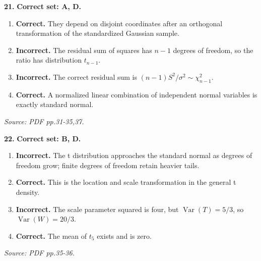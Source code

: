 \documentclass[11pt,a4paper]{article}
\begin{document}
\par\noindent\begin{minipage}{\linewidth}
\textbf{21.} \textbf{Correct set: A, D.}
\begin{enumerate}[label=(\Alph*),leftmargin=8mm,itemsep=2pt,topsep=2pt]
\item \textbf{Correct.} They depend on disjoint coordinates after an orthogonal transformation of the standardized Gaussian sample.
\item \textbf{Incorrect.} The residual sum of squares has \(n-1\) degrees of freedom, so the ratio has distribution \(t_{n-1}\).
\item \textbf{Incorrect.} The correct residual sum is \((n-1)S^2/\sigma^2\sim\chi^2_{n-1}\).
\item \textbf{Correct.} A normalized linear combination of independent normal variables is exactly standard normal.
\end{enumerate}
{\footnotesize\textit{Source: PDF pp.31-35,37.}}

\end{minipage}\par\vspace{3mm}
\par\noindent\begin{minipage}{\linewidth}
\textbf{22.} \textbf{Correct set: B, D.}
\begin{enumerate}[label=(\Alph*),leftmargin=8mm,itemsep=2pt,topsep=2pt]
\item \textbf{Incorrect.} The t distribution approaches the standard normal as degrees of freedom grow; finite degrees of freedom retain heavier tails.
\item \textbf{Correct.} This is the location and scale transformation in the general t density.
\item \textbf{Incorrect.} The scale parameter squared is four, but \(\operatorname{Var}(T)=5/3\), so \(\operatorname{Var}(W)=20/3\).
\item \textbf{Correct.} The mean of \(t_5\) exists and is zero.
\end{enumerate}
{\footnotesize\textit{Source: PDF pp.35-36.}}

\end{minipage}\par\vspace{3mm}
\end{document}
